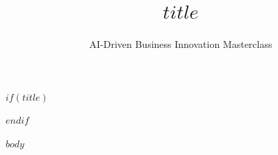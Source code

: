 \documentclass[11pt,letterpaper]{article}
\begin{document}
$if(title)$
\title{$title$}
\author{AI-Driven Business Innovation Masterclass}
\date{}
\maketitle
\thispagestyle{empty}
$endif$

$body$
\end{document}

